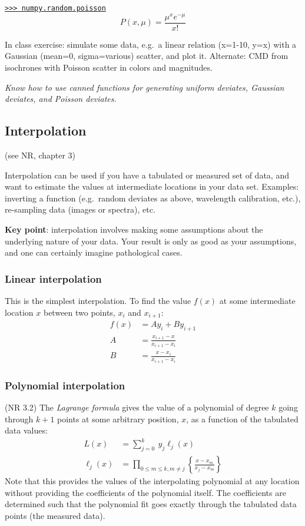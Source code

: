 \documentclass{article}
\newcommand{\test}[1]{%
    \begin{center}
        \colorbox{hl}{\parbox{0.9\textwidth}{\emph{\centering #1}}}
    \end{center}}
\begin{document}
\href{http://docs.scipy.org/doc/numpy/reference/generated/numpy.random.poisson.html}
{\texttt{>>> numpy.random.poisson}}
\begin{equation*}
    P(x,\mu) = \frac{\mu^xe^{-\mu}}{x!}
\end{equation*}

\begin{framed}
In class exercise: simulate some data, e.g.\ a linear relation (x=1-10, y=x)
with a Gaussian (mean=0, sigma=various) scatter, and plot it.
Alternate: CMD from
isochrones with Poisson scatter in colors and magnitudes.
\end{framed}

\test{Know how to use canned functions for generating uniform deviates,
Gaussian deviates, and Poisson deviates.}

\subsection{Interpolation}
(see NR, chapter 3)

Interpolation can be used if you have a tabulated or measured set of
data, and want to estimate the values at intermediate locations in your data
set. Examples: inverting a function (e.g.\ random deviates as above,
wavelength calibration, etc.), re-sampling data (images or spectra), etc.

\textbf{Key point}: interpolation involves making some assumptions about the
underlying nature of your data. Your result is only as good as your
assumptions, and one can certainly imagine pathological cases.

\subsubsection{Linear interpolation}
This is the simplest interpolation. To find the value $f(x)$ at some
intermediate location $x$ between two points, $x_{i}$ and $x_{i+1}$:
\begin{align*}
    f(x) &= Ay_{i} + By_{i+1} \\
    A &= \frac{x_{i+1} - x}{x_{i+1} - x_{i}} \\
    B &= \frac{x - x_{i}}{x_{i+1} - x_{i}}
\end{align*}

\subsubsection{Polynomial interpolation}
(NR 3.2)
The \textit{Lagrange formula} gives the value of a polynomial
of degree $k$ going through $k+1$ points at some arbitrary position,
$x$, as a function of the tabulated data values:
\begin{align*}
    L(x) &= \sum ^k_{j=0} \ y_{j} \ell_{j} (x) \\
    \ell_{j}(x) &= \prod_{0 \leq m \leq k, m \ne j}{
        \left\{ \frac {x - x_{m}} {x_{j} - x_{m}} \right\}
    }
\end{align*}
Note that this provides the values of the interpolating polynomial at
any location without providing the coefficients of the polynomial itself.
The coefficients are determined such that the polynomial fit goes exactly
through the tabulated data points (the measured data).
\end{document}
